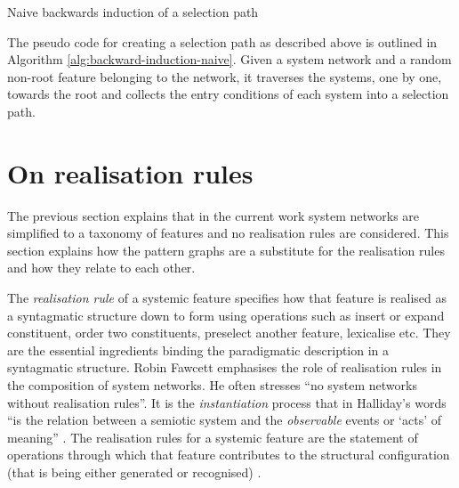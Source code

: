    \begin{algorithm}[!ht]
        \Input {\feature, \snet}
        \caption{Naive backwards induction of a selection path}
        \label{alg:backward-induction-naive}
    \end{algorithm}

    The pseudo code for creating a selection path as described above is outlined in Algorithm \ref{alg:backward-induction-naive}. Given a system network and a random non-root feature belonging to the network, it traverses the systems, one by one, towards the root and collects the entry conditions of each system into a selection path.

\section{On realisation rules}
\label{sec:realisation-reules}
    The previous section explains that in the current work system networks are simplified to a taxonomy of features and no realisation rules are considered. This section explains how the pattern graphs are a substitute for the realisation rules and how they relate to each other.

    The \textit{realisation rule} of a systemic feature specifies how that feature is realised as a syntagmatic structure down to form using operations such as insert or expand constituent, order two constituents, preselect another feature, lexicalise etc. They are the essential ingredients binding the paradigmatic description in a syntagmatic structure. Robin Fawcett emphasises the role of realisation rules in the composition of system networks. He often stresses ``no system networks without realisation rules''. It is the \textit{instantiation} process that in Halliday's words ``is the relation between a semiotic system and the \textit{observable} events or `acts' of meaning'' \citep[emphasis added]{Halliday2003-systemic-theory}. The realisation rules for a systemic feature are the statement of operations through which that feature contributes to the structural configuration (that is being either generated or recognised) \citep[p.86]{Fawcett2000}.


